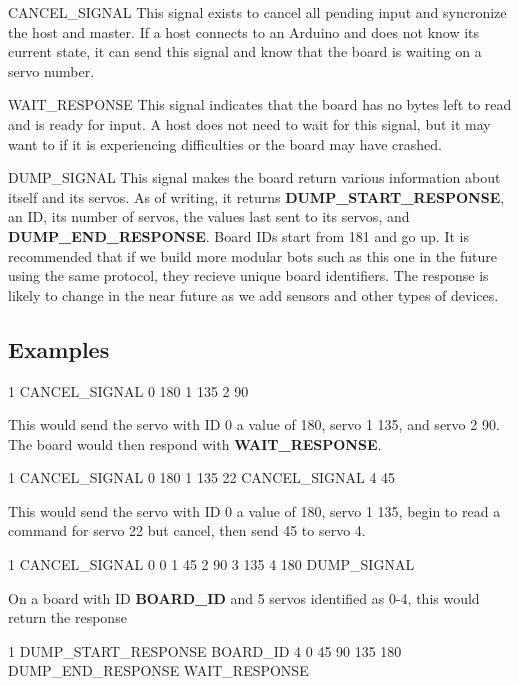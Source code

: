 \begin{DoxyParagraph}{C\+A\+N\+C\+E\+L\+\_\+\+S\+I\+G\+N\+A\+L}
This signal exists to cancel all pending input and syncronize the host and master. If a host connects to an Arduino and does not know its current state, it can send this signal and know that the board is waiting on a servo number.
\end{DoxyParagraph}
\begin{DoxyParagraph}{W\+A\+I\+T\+\_\+\+R\+E\+S\+P\+O\+N\+S\+E}
This signal indicates that the board has no bytes left to read and is ready for input. A host does not need to wait for this signal, but it may want to if it is experiencing difficulties or the board may have crashed.
\end{DoxyParagraph}
\begin{DoxyParagraph}{D\+U\+M\+P\+\_\+\+S\+I\+G\+N\+A\+L}
This signal makes the board return various information about itself and its servos. As of writing, it returns {\bfseries D\+U\+M\+P\+\_\+\+S\+T\+A\+R\+T\+\_\+\+R\+E\+S\+P\+O\+N\+S\+E}, an I\+D, its number of servos, the values last sent to its servos, and {\bfseries D\+U\+M\+P\+\_\+\+E\+N\+D\+\_\+\+R\+E\+S\+P\+O\+N\+S\+E}. Board I\+Ds start from 181 and go up. It is recommended that if we build more modular bots such as this one in the future using the same protocol, they recieve unique board identifiers. The response is likely to change in the near future as we add sensors and other types of devices.
\end{DoxyParagraph}
\hypertarget{index_Examples}{}\subsection{Examples}\label{index_Examples}

\begin{DoxyCode}
1 CANCEL\_SIGNAL 0 180 1 135 2 90
\end{DoxyCode}
 This would send the servo with I\+D 0 a value of 180, servo 1 135, and servo 2 90. The board would then respond with {\bfseries W\+A\+I\+T\+\_\+\+R\+E\+S\+P\+O\+N\+S\+E}. 
\begin{DoxyCode}
1 CANCEL\_SIGNAL 0 180 1 135 22 CANCEL\_SIGNAL 4 45
\end{DoxyCode}
 This would send the servo with I\+D 0 a value of 180, servo 1 135, begin to read a command for servo 22 but cancel, then send 45 to servo 4. 
\begin{DoxyCode}
1 CANCEL\_SIGNAL 0 0 1 45 2 90 3 135 4 180 DUMP\_SIGNAL
\end{DoxyCode}
 On a board with I\+D {\bfseries B\+O\+A\+R\+D\+\_\+\+I\+D} and 5 servos identified as 0-\/4, this would return the response 
\begin{DoxyCode}
1 DUMP\_START\_RESPONSE BOARD\_ID 4 0 45 90 135 180 DUMP\_END\_RESPONSE WAIT\_RESPONSE
\end{DoxyCode}
 
